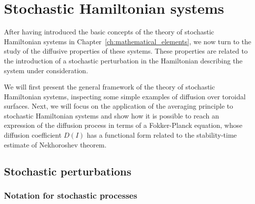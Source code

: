 
\chapter{Stochastic Hamiltonian systems}\label{ch:the_diffusive_framework}

After having introduced the basic concepts of the theory of stochastic Hamiltonian systems in Chapter~\ref{ch:mathematical_elements}, we now turn to the study of the diffusive properties of these systems. These properties are related to the introduction of a stochastic perturbation in the Hamiltonian describing the system under consideration.

We will first present the general framework of the theory of stochastic Hamiltonian systems, inspecting some simple examples of diffusion over toroidal surfaces. Next, we will focus on the application of the averaging principle to stochastic Hamiltonian systems and show how it is possible to reach an expression of the diffusion process in terms of a Fokker-Planck equation, whose diffusion coefficient $D(I)$ has a functional form related to the stability-time estimate of Nekhoroshev theorem.

\section{Stochastic perturbations}

\subsection{Notation for stochastic processes}
\label{subsec:Diffusion for a stochastically perturbed integrable system}


